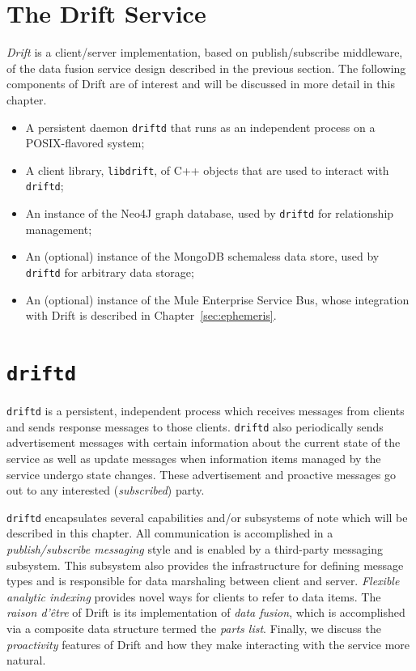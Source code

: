 \newcommand{\driftd}{\texttt{driftd}\xspace}
\newcommand{\libdrift}{\texttt{libdrift}\xspace}
\newcommand{\dpart}{\texttt{Part}\xspace}
\newcommand{\dparts}{\texttt{Part}s\xspace}

\section{The Drift Service}

\emph{Drift} is a client/server implementation, based on publish/subscribe middleware, of the data fusion
service design described in the previous section.  The following components of Drift are of interest and
will be discussed in more detail in this chapter.

\begin{itemize}
\item A persistent daemon \texttt{driftd} that runs as an independent process on a POSIX-flavored system;
\item A client library, \libdrift, of C++ objects that are used to interact with \driftd;
\item An instance of the Neo4J graph database, used by \driftd for relationship management;
\item An (optional) instance of the MongoDB schemaless data store, used by \driftd for arbitrary data
  storage;
\item An (optional) instance of the Mule Enterprise Service Bus, whose integration with Drift is
  described in Chapter~\ref{sec:ephemeris}.
\end{itemize}

\section{\driftd}

\driftd is a persistent, independent process which receives messages from clients and sends response
messages to those clients.  \driftd also periodically sends advertisement messages with certain
information about the current state of the service as well as update messages when information items
managed by the service undergo state changes.  These advertisement and proactive messages go out to any
interested (\emph{subscribed}) party.  

\driftd encapsulates several capabilities and/or subsystems of note which will be described in this
chapter. All communication is accomplished in a \emph{publish/subscribe messaging} style and is enabled by a
third-party messaging subsystem.  This subsystem also provides the infrastructure for defining message
types and is responsible for data marshaling between client and server.  \emph{Flexible analytic
  indexing} provides novel ways for clients to refer to data items.  The \emph{raison d'\^{e}tre} of
Drift is its implementation of \emph{data fusion}, which is accomplished via a composite data structure
termed the \emph{parts list}.  Finally, we discuss the \emph{proactivity} features of Drift and how they
make interacting with the service more natural.

